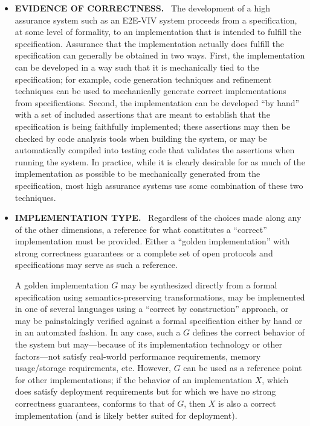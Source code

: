 \begin{itemize}
\item \textbf{EVIDENCE OF CORRECTNESS.} \ The development of a high
  assurance system such as an E2E-VIV system proceeds from a
  specification, at some level of formality, to an implementation that
  is intended to fulfill the specification. Assurance that the
  implementation actually does fulfill the specification can generally
  be obtained in two ways. First, the implementation can be developed
  in a way such that it is mechanically tied to the specification; for
  example, code generation techniques and refinement techniques can be
  used to mechanically generate correct implementations from
  specifications. Second, the implementation can be developed ``by
  hand'' with a set of included assertions that are meant to establish
  that the specification is being faithfully implemented; these
  assertions may then be checked by code analysis tools when building
  the system, or may be automatically compiled into testing code that
  validates the assertions when running the system. In practice, while
  it is clearly desirable for as much of the implementation as
  possible to be mechanically generated from the specification, most
  high assurance systems use some combination of these two techniques.

\item \textbf{IMPLEMENTATION TYPE.} \ Regardless of the choices made
  along any of the other dimensions, a reference for what constitutes
  a ``correct'' implementation must be provided. Either a ``golden
  im\-ple\-men\-ta\-tion'' with strong correctness guarantees or a
  complete set of open protocols and specifications may serve as such
  a reference.

  A golden implementation $G$ may be synthesized directly from a
  formal specification using semantics-preserving transformations, may
  be implemented in one of several languages using a ``correct by
  construction'' approach, or may be painstakingly verified against a
  formal specification either by hand or in an automated fashion. In
  any case, such a $G$ defines the correct behavior of the system but
  may---because of its implementation technology or other
  factors---not satisfy real-world performance requirements, memory
  usage/storage requirements, etc.  However, $G$ can be used as a
  reference point for other implementations; if the behavior of an
  implementation $X$, which does satisfy deployment requirements but
  for which we have no strong correctness guarantees, conforms to that
  of $G$, then $X$ is also a correct implementation (and is likely
  better suited for deployment).


\end{itemize}
